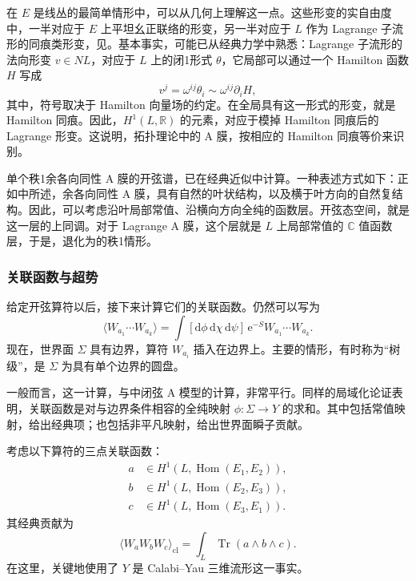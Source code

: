 在 $E$ 是线丛的最简单情形中，可以从几何上理解这一点。这些形变的实自由度中，一半对应于 $E$ 上平坦幺正联络的形变，另一半对应于 $L$ 作为 Lagrange 子流形的同痕类形变，见。基本事实，可能已从经典力学中熟悉：Lagrange 子流形的法向形变 $v\in NL$，对应于 $L$ 上的闭1形式 $\theta$，它局部可以通过一个 Hamilton 函数 $H$ 写成
\[
v^j=\omega^{ij}\theta_i\sim\omega^{ij}\partial_iH,
\]
其中，符号取决于 Hamilton 向量场的约定。在全局具有这一形式的形变，就是 Hamilton 同痕。因此，$H^1(L,\mathbb{R})$ 的元素，对应于模掉 Hamilton 同痕后的 Lagrange 形变。这说明，拓扑理论中的 A 膜，按相应的 Hamilton 同痕等价来识别。

单个秩1余各向同性 A 膜的开弦谱，已在经典近似中计算。一种表述方式如下：正如中所述，余各向同性 A 膜，具有自然的叶状结构，以及横于叶方向的自然复结构。因此，可以考虑沿叶局部常值、沿横向方向全纯的函数层。开弦态空间，就是这一层的上同调。对于 Lagrange A 膜，这个层就是 $L$ 上局部常值的 $\mathbb{C}$ 值函数层，于是，退化为的秩1情形。

\subsubsection{关联函数与超势}\label{sec:3.6.2.2}

给定开弦算符以后，接下来计算它们的关联函数。仍然可以写为
\begin{equation}\label{eq:3.174}
\langle W_{a_1}\cdots W_{a_k}\rangle
=\int[\mathrm{d}\phi\,\mathrm{d}\chi\,\mathrm{d}\psi]\,
\mathrm{e}^{-S}W_{a_1}\cdots W_{a_k}.
\end{equation}
现在，世界面 $\Sigma$ 具有边界，算符 $W_{a_i}$ 插入在边界上。主要的情形，有时称为“树级”，是 $\Sigma$ 为具有单个边界的圆盘。

一般而言，这一计算，与中闭弦 A 模型的计算，非常平行。同样的局域化论证表明，关联函数是对与边界条件相容的全纯映射 $\phi\colon\Sigma\to Y$ 的求和。其中包括常值映射，给出经典项；也包括非平凡映射，给出世界面瞬子贡献。

考虑以下算符的三点关联函数：
\begin{equation}\label{eq:3.175}
\begin{aligned}
a&\in H^1(L,\operatorname{Hom}(E_1,E_2)),\\
b&\in H^1(L,\operatorname{Hom}(E_2,E_3)),\\
c&\in H^1(L,\operatorname{Hom}(E_3,E_1)).
\end{aligned}
\end{equation}
其经典贡献为
\begin{equation}\label{eq:3.176}
\langle W_aW_bW_c\rangle_{\mathrm{cl}}
=\int_L\operatorname{Tr}(a\wedge b\wedge c).
\end{equation}
在这里，关键地使用了 $Y$ 是 Calabi--Yau 三维流形这一事实。

